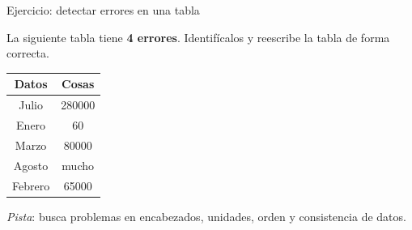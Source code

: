 \documentclass[aspectratio=169, 10pt, spanish]{beamer}
\begin{document}
\begin{frame}{Ejercicio: detectar errores en una tabla}
  \begin{comprenderbox}
    La siguiente tabla tiene \textbf{4 errores}. Identifícalos
    y reescribe la tabla de forma correcta.

    \vspace{0.25cm}
    \begin{center}
    \AlmFontSmall
    \begin{tabular}{cc}
      \toprule
      \rowcolor{AlmTerra!10}
      \textbf{Datos} & \textbf{Cosas} \\
      \midrule
      Julio  & 280000 \\
      Enero  & 60 \\
      Marzo  & 80000 \\
      Agosto & mucho \\
      Febrero& 65000 \\
      \bottomrule
    \end{tabular}
    \end{center}

    \vspace{0.15cm}
    \textit{Pista}: busca problemas en encabezados, unidades,
    orden y consistencia de datos.
  \end{comprenderbox}
\end{frame}
\end{document}
